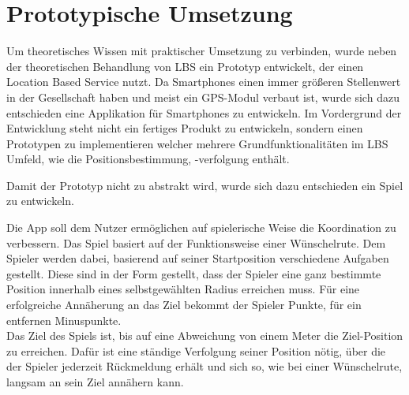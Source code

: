 \newpage
\section{Prototypische Umsetzung}

Um theoretisches Wissen mit praktischer Umsetzung zu verbinden, wurde neben der theoretischen Behandlung von LBS ein Prototyp entwickelt, der einen Location Based Service nutzt. Da Smartphones einen immer größeren Stellenwert in der Gesellschaft haben und meist ein GPS-Modul verbaut ist, wurde sich dazu entschieden eine Applikation für Smartphones zu entwickeln. Im Vordergrund der Entwicklung steht nicht ein fertiges Produkt zu entwickeln, sondern einen Prototypen zu implementieren welcher mehrere Grundfunktionalitäten im LBS Umfeld, wie die Positionsbestimmung, -verfolgung enthält.

Damit der Prototyp nicht zu abstrakt wird, wurde sich dazu entschieden ein Spiel zu entwickeln.


%
%
Die App soll dem Nutzer ermöglichen auf spielerische Weise die Koordination zu verbessern. Das Spiel basiert auf der Funktionsweise einer Wünschelrute. Dem Spieler werden dabei, basierend auf seiner Startposition verschiedene Aufgaben gestellt. Diese sind in der Form gestellt, dass der Spieler eine ganz bestimmte Position innerhalb eines selbstgewählten Radius erreichen muss. Für eine erfolgreiche Annäherung an das Ziel bekommt der Spieler Punkte, für ein entfernen Minuspunkte.
\\
Das Ziel des Spiels ist, bis auf eine Abweichung von einem Meter die Ziel-Position zu erreichen. Dafür ist eine ständige Verfolgung seiner Position nötig, über die der Spieler jederzeit Rückmeldung erhält und sich so, wie bei einer Wünschelrute, langsam an sein Ziel annähern kann.









